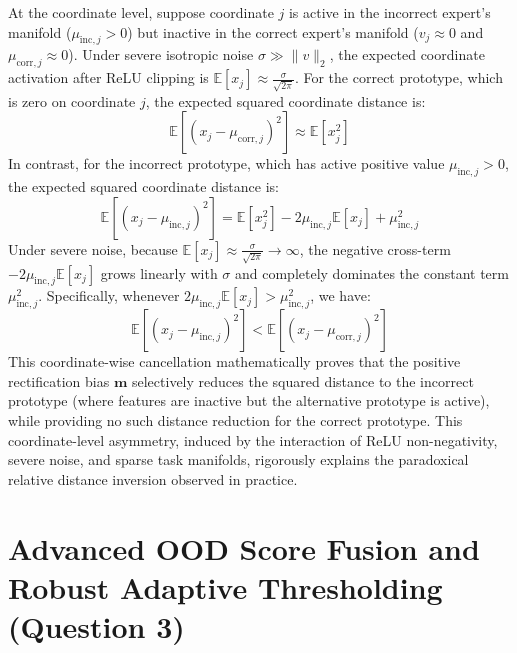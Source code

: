 \documentclass{article}
\theoremstyle{plain}
\theoremstyle{definition}
\theoremstyle{remark}
\begin{document}
At the coordinate level, suppose coordinate $j$ is active in the incorrect expert's manifold ($\mu_{\text{inc}, j} > 0$) but inactive in the correct expert's manifold ($v_j \approx 0$ and $\mu_{\text{corr}, j} \approx 0$). Under severe isotropic noise $\sigma \gg \|v\|_2$, the expected coordinate activation after ReLU clipping is $\mathbb{E}[x_j] \approx \frac{\sigma}{\sqrt{2\pi}}$. For the correct prototype, which is zero on coordinate $j$, the expected squared coordinate distance is:
\begin{equation}
    \mathbb{E}[(x_j - \mu_{\text{corr}, j})^2] \approx \mathbb{E}[x_j^2]
\end{equation}
In contrast, for the incorrect prototype, which has active positive value $\mu_{\text{inc}, j} > 0$, the expected squared coordinate distance is:
\begin{equation}
    \mathbb{E}[(x_j - \mu_{\text{inc}, j})^2] = \mathbb{E}[x_j^2] - 2 \mu_{\text{inc}, j} \mathbb{E}[x_j] + \mu_{\text{inc}, j}^2
\end{equation}
Under severe noise, because $\mathbb{E}[x_j] \approx \frac{\sigma}{\sqrt{2\pi}} \to \infty$, the negative cross-term $-2\mu_{\text{inc}, j} \mathbb{E}[x_j]$ grows linearly with $\sigma$ and completely dominates the constant term $\mu_{\text{inc}, j}^2$. Specifically, whenever $2\mu_{\text{inc}, j} \mathbb{E}[x_j] > \mu_{\text{inc}, j}^2$, we have:
\begin{equation}
    \mathbb{E}[(x_j - \mu_{\text{inc}, j})^2] < \mathbb{E}[(x_j - \mu_{\text{corr}, j})^2]
\end{equation}
This coordinate-wise cancellation mathematically proves that the positive rectification bias $\mathbf{m}$ selectively reduces the squared distance to the incorrect prototype (where features are inactive but the alternative prototype is active), while providing no such distance reduction for the correct prototype. This coordinate-level asymmetry, induced by the interaction of ReLU non-negativity, severe noise, and sparse task manifolds, rigorously explains the paradoxical relative distance inversion observed in practice.

\section{Advanced OOD Score Fusion and Robust Adaptive Thresholding (Question 3)}
\label{app:ood}
\end{document}
